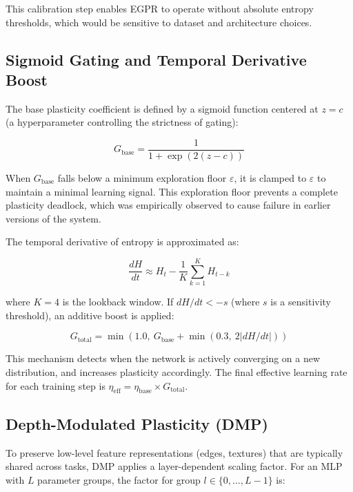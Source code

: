 \documentclass[11pt,a4paper]{article}
\begin{document}
This calibration step enables EGPR to operate without absolute entropy thresholds, which would be sensitive to dataset and architecture choices.

\subsection{Sigmoid Gating and Temporal Derivative Boost}

The base plasticity coefficient is defined by a sigmoid function centered at $z = c$ (a hyperparameter controlling the strictness of gating):

\begin{equation}
G_{\text{base}} = \frac{1}{1 + \exp(2(z - c))}
\end{equation}

When $G_{\text{base}}$ falls below a minimum exploration floor $\varepsilon$, it is clamped to $\varepsilon$ to maintain a minimal learning signal. This exploration floor prevents a complete plasticity deadlock, which was empirically observed to cause failure in earlier versions of the system.

The temporal derivative of entropy is approximated as:

\begin{equation}
\frac{dH}{dt} \approx H_t - \frac{1}{K}\sum_{k=1}^{K} H_{t-k}
\end{equation}

where $K = 4$ is the lookback window. If $dH/dt < -s$ (where $s$ is a sensitivity threshold), an additive boost is applied:

\begin{equation}
G_{\text{total}} = \min\left(1.0, \ G_{\text{base}} + \min(0.3, \ 2|dH/dt|)\right)
\end{equation}

This mechanism detects when the network is actively converging on a new distribution, and increases plasticity accordingly. The final effective learning rate for each training step is $\eta_{\text{eff}} = \eta_{\text{base}} \times G_{\text{total}}$.

\subsection{Depth-Modulated Plasticity (DMP)}

To preserve low-level feature representations (edges, textures) that are typically shared across tasks, DMP applies a layer-dependent scaling factor. For an MLP with $L$ parameter groups, the factor for group $l \in \{0, \dots, L-1\}$ is:
\end{document}
